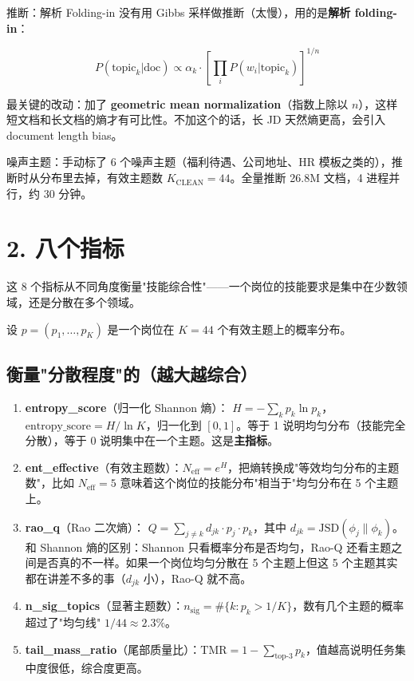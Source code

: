 \documentclass[12pt,a4paper]{article}
\begin{document}
\begin{defbox}{推断：解析 Folding-in}
没有用 Gibbs 采样做推断（太慢），用的是\textbf{解析 folding-in}：

$$P(\text{topic}_k | \text{doc}) \propto \alpha_k \cdot \left[\prod_{i} P(w_i | \text{topic}_k)\right]^{1/n}$$

最关键的改动：加了 \textbf{geometric mean normalization}（指数上除以 $n$），这样短文档和长文档的熵才有可比性。不加这个的话，长 JD 天然熵更高，会引入 document length bias。

噪声主题：手动标了 6 个噪声主题（福利待遇、公司地址、HR 模板之类的），推断时从分布里去掉，有效主题数 $K_{\text{CLEAN}} = 44$。全量推断 26.8M 文档，4 进程并行，约 30 分钟。
\end{defbox}

\bigskip

\section*{2. 八个指标}

这 8 个指标从不同角度衡量"技能综合性"——一个岗位的技能要求是集中在少数领域，还是分散在多个领域。

设 $p = (p_1, \ldots, p_K)$ 是一个岗位在 $K{=}44$ 个有效主题上的概率分布。

\subsection*{衡量"分散程度"的（越大越综合）}

\begin{enumerate}
  \item \textbf{entropy\_score}（归一化 Shannon 熵）：
  $H = -\sum_k p_k \ln p_k$，$\text{entropy\_score} = H / \ln K$，归一化到 $[0,1]$。等于 1 说明均匀分布（技能完全分散），等于 0 说明集中在一个主题。这是\textbf{主指标}。

  \item \textbf{ent\_effective}（有效主题数）：$N_{\text{eff}} = e^H$，把熵转换成"等效均匀分布的主题数"，比如 $N_{\text{eff}}{=}5$ 意味着这个岗位的技能分布"相当于"均匀分布在 5 个主题上。

  \item \textbf{rao\_q}（Rao 二次熵）：
  $Q = \sum_{j \neq k} d_{jk} \cdot p_j \cdot p_k$，其中 $d_{jk} = \text{JSD}(\phi_j \| \phi_k)$。和 Shannon 熵的区别：Shannon 只看概率分布是否均匀，Rao-Q 还看主题之间是否真的不一样。如果一个岗位均匀分散在 5 个主题上但这 5 个主题其实都在讲差不多的事（$d_{jk}$ 小），Rao-Q 就不高。

  \item \textbf{n\_sig\_topics}（显著主题数）：$n_{\text{sig}} = \#\{k : p_k > 1/K\}$，数有几个主题的概率超过了"均匀线" $1/44 \approx 2.3\%$。

  \item \textbf{tail\_mass\_ratio}（尾部质量比）：$\text{TMR} = 1 - \sum_{\text{top-3}} p_k$，值越高说明任务集中度很低，综合度更高。
\end{enumerate}
\end{document}
